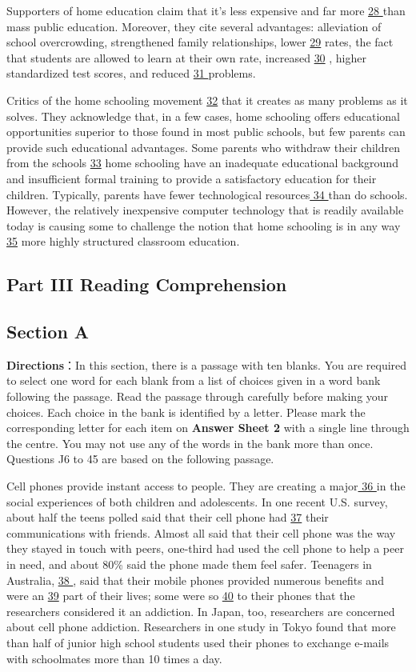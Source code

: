 \documentclass[UTF8,11pt]{ctexart}
\begin{document}
Supporters of home education claim that it’s less expensive and far more \uline{28 }than mass public education. Moreover, they cite several advantages: alleviation of school overcrowding, strengthened family relationships, lower \uline{29} rates, the fact that students are allowed to learn at their own rate, increased \uline{30} , higher standardized test scores, and reduced \uline{31 }problems.


Critics of the home schooling movement \uline{32} that it creates as many problems as it solves. They acknowledge that, in a few cases, home schooling offers educational opportunities superior to those found in most public schools, but few parents can provide such educational advantages. Some parents who withdraw their children from the schools \uline{33} home schooling have an inadequate educational background and insufficient formal training to provide a satisfactory education for their children. Typically, parents have fewer technological resources\uline{ 34 }than do schools. However, the relatively inexpensive computer technology that is readily available today is causing some to challenge the notion that home schooling is in any way \uline{35} more highly structured classroom education.


\subsection*{\textbf{Part III} \textbf{Reading Comprehension}}


\subsection*{\textbf{Section A}}


\textbf{Directions}：In this section, there is a passage with ten blanks. You are required to select one word for each blank from a list of choices given in a word bank following the passage. Read the passage through carefully before making your choices. Each choice in the bank is identified by a letter. Please mark the corresponding letter for each item on\textbf{ Answer Sheet 2} with a single line through the centre. You may not use any of the words in the bank more than once. Questions J6 to 45 are based on the following passage.


Cell phones provide instant access to people. They are creating a major\uline{ 36 }in the social experiences of both children and adolescents. In one recent U.S. survey, about half the teens polled said that their cell phone had \uline{37} their communications with friends. Almost all said that their cell phone was the way they stayed in touch with peers, one-third had used the cell phone to help a peer in need, and about 80\% said the phone made them feel safer. Teenagers in Australia, \uline{38 }, said that their mobile phones provided numerous benefits and were an \uline{39} part of their lives; some were so \uline{40} to their phones that the researchers considered it an addiction. In Japan, too, researchers are concerned about cell phone addiction. Researchers in one study in Tokyo found that more than half of junior high school students used their phones to exchange e-mails with schoolmates more than 10 times a day.
\end{document}
